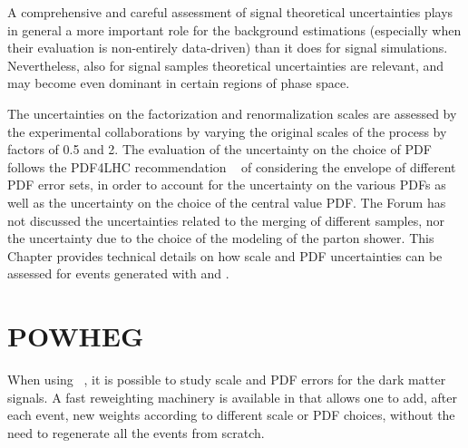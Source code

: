 
A comprehensive and careful assessment of signal theoretical uncertainties
plays in general a more important role for the background estimations
(especially when their evaluation is non-entirely data-driven) than it
does for signal simulations. Nevertheless, also for signal samples theoretical 
uncertainties are relevant, and may become even dominant in certain regions of phase space.

The uncertainties on the factorization and renormalization scales are assessed by the experimental collaborations by varying
the original scales of the process by factors of 0.5 and 2. The evaluation of the uncertainty on the choice of PDF follows
the PDF4LHC recommendation ~\cite{PDF4LHC} of considering the envelope of different PDF error sets, in order to account
for the uncertainty on the various PDFs as well as the uncertainty on the choice of the central value PDF. 
The Forum has not discussed the uncertainties related to the merging of different samples, nor the uncertainty
due to the choice of the modeling of the parton shower.  
This Chapter provides technical details on how scale and PDF uncertainties can be assessed 
for events generated with \powheg and \madgraph.



\section{POWHEG}

When using \powheg~\cite{Frixione:2007vw,Alioli:2010xd,Nason:2004rx}, it is
possible to study scale and PDF errors for the dark matter signals. A
fast reweighting machinery is available in  that
allows one to add, after each event, new weights according to
different scale or PDF choices, without the need to regenerate all the
events from scratch. 

